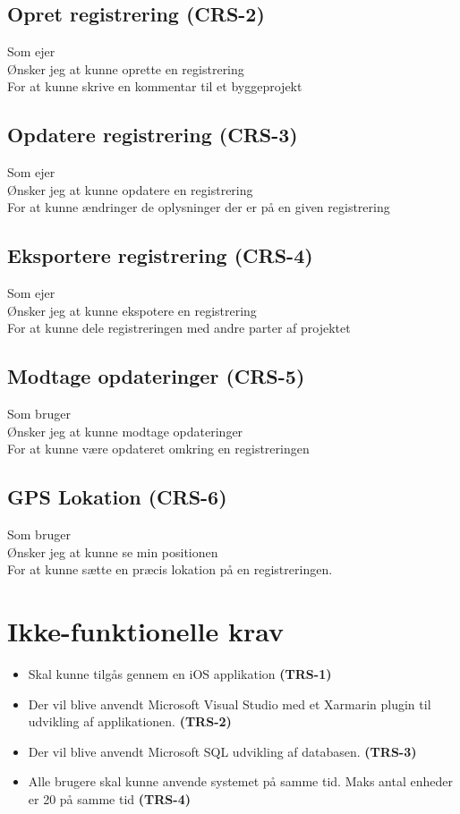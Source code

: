 	\subsection*{Opret registrering (CRS-2)}
	Som ejer\\
	Ønsker jeg at kunne oprette en registrering\\
	For at kunne skrive en kommentar til et byggeprojekt
	
	\subsection*{Opdatere registrering (CRS-3)}
	Som ejer\\
	Ønsker jeg at kunne opdatere en registrering\\
	For at kunne ændringer de oplysninger der er på en given registrering
	
	\subsection*{Eksportere registrering (CRS-4)}
	Som ejer\\
	Ønsker jeg at kunne ekspotere en registrering\\
	For at kunne dele registreringen med andre parter af projektet
	
	\subsection*{Modtage opdateringer (CRS-5)}
	Som bruger\\
	Ønsker jeg at kunne modtage opdateringer\\
	For at kunne være opdateret omkring en registreringen
	
	\subsection*{GPS Lokation (CRS-6)}
	Som bruger\\
	Ønsker jeg at kunne se min positionen \\
	For at kunne sætte en præcis lokation på en registreringen. \\
	
	\section{Ikke-funktionelle krav}
	\begin{itemize}[-]
		\itemsep 0.3em 
		\item Skal kunne tilgås gennem en iOS applikation \textbf{(TRS-1)}
		\item Der vil blive anvendt Microsoft Visual Studio med et Xarmarin plugin til udvikling af applikationen. \textbf{(TRS-2)}
		\item Der vil blive anvendt Microsoft SQL udvikling af databasen. \textbf{(TRS-3)}
		\item Alle brugere skal kunne anvende systemet på samme tid. Maks antal enheder er 20 på samme tid \textbf{(TRS-4)}
	\end{itemize}
	